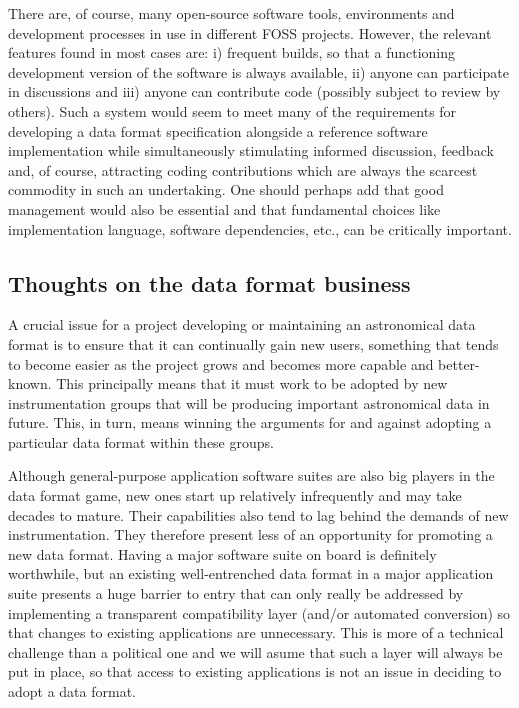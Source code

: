 \documentclass[final,authoryear,5p,times,twocolumn]{elsarticle}
\begin{document}
There are, of course, many open-source software tools, environments
and development processes in use in different FOSS projects. However,
the relevant features found in most cases are: i) frequent builds, so
that a functioning development version of the software is always
available, ii) anyone can participate in discussions and iii) anyone
can contribute code (possibly subject to review by others). Such a
system would seem to meet many of the requirements for developing a
data format specification alongside a reference software
implementation while simultaneously stimulating informed discussion,
feedback and, of course, attracting coding contributions which are
always the scarcest commodity in such an undertaking. One should
perhaps add that good management would also be essential and that
fundamental choices like implementation language, software
dependencies, etc., can be critically important.

\subsection{Thoughts on the data format business}

A crucial issue for a project developing or maintaining an
astronomical data format is to ensure that it can continually gain new
users, something that tends to become easier as the project grows and
becomes more capable and better-known. This principally means that it
must work to be adopted by new instrumentation groups that will be
producing important astronomical data in future. This, in turn, means
winning the arguments for and against adopting a particular data
format within these groups.

Although general-purpose application software suites are also big
players in the data format game, new ones start up relatively
infrequently and may take decades to mature. Their capabilities also
tend to lag behind the demands of new instrumentation. They therefore
present less of an opportunity for promoting a new data format. Having
a major software suite on board is definitely worthwhile, but an
existing well-entrenched data format in a major application suite
presents a huge barrier to entry that can only really be addressed by
implementing a transparent compatibility layer (and/or automated
conversion) so that changes to existing applications are
unnecessary. This is more of a technical challenge than a political
one and we will asume that such a layer will always be put in place,
so that access to existing applications is not an issue in deciding to
adopt a data format.
\end{document}

